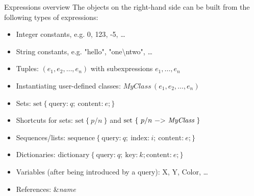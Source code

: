 \documentclass[%
beamer,%
english,%
10pt,%
]{beamer}
\newcommand{\blue}[1]{{\color{blue}#1}}
\begin{document}
\begin{frame}{Expressions overview}
    The objects on the right-hand side can be built from the following types of expressions:
    \begin{itemize}
        \item Integer constants, e.g. \blue{0}, \blue{123}, \blue{-5}, \dots
        \item String constants, e.g. \blue{"hello"}, \blue{"one\textbackslash{}ntwo"}, \dots
        \item Tuples: \blue{$(e_1,e_2,\dots,e_n)$} with subexpressions $e_1,\dots,e_n$
        \item Instantiating user-defined classes: \blue{$\textit{MyClass}\,(e_1,e_2,\dots,e_n)$}
        \item Sets: \blue{$\text{set}~\{~\text{query:}~q;~\text{content:}~e;\}$}
        \item Shortcuts for sets: \blue{$\text{set}~\{~p/n~\}$} and \blue{$\text{set}~\{~p/n~\lstinline{->}~\textit{MyClass}~\}$}
        \item Sequences/lists: \blue{$\text{sequence}~\{~\text{query:}~q;~\text{index:}~i;~\text{content:}~e;\}$}
        \item Dictionaries: \blue{$\text{dictionary}~\{~\text{query:}~q;~\text{key:}~k;\text{content:}~e;\}$}
        \item Variables (after being introduced by a \blue{query}): \blue{X}, \blue{Y}, \blue{Color}, \dots
        \item References: \blue{\&\textit{name}}
    \end{itemize}
\end{frame}
\end{document}
